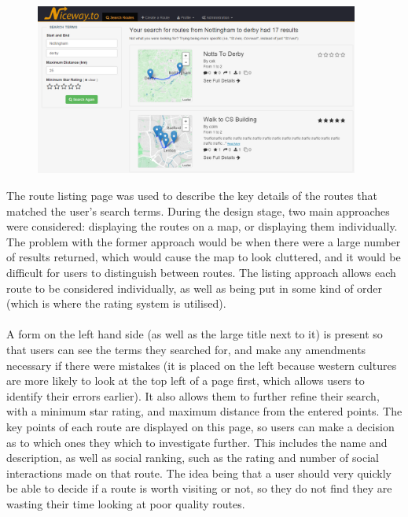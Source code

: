\begin{figure}[!ht]
	\vspace{-5mm}
	\begin{center}
		\includegraphics[width=0.95\textwidth]{images/design/listing.png}
	\end{center}
	\vspace{-10mm}
\end{figure}
\newpage 


\noindent 
The route listing page was used to describe the key details of the routes that matched the user's search terms. During the design stage, two main approaches were considered: displaying the routes on a map, or displaying them individually. The problem with the former approach would be when there were a large number of results returned, which would cause the map to look cluttered, and it would be difficult for users to distinguish between routes. The listing approach allows each route to be considered individually, as well as being put in some kind of order (which is where the rating system is utilised). \ \\
\ \\
A form on the left hand side (as well as the large title next to it) is present so that users can see the terms they searched for, and make any amendments necessary if there were mistakes (it is placed on the left because western cultures are more likely to look at the top left of a page first\cite{mccarthy2004could}, which allows users to identify their errors earlier). It also allows them to further refine their search, with a minimum star rating, and maximum distance from the entered points. The key points of each route are displayed on this page, so users can make a decision as to which ones they which to investigate further. This includes the name and description, as well as social ranking, such as the rating and number of social interactions made on that route. The idea being that a user should very quickly be able to decide if a route is worth visiting or not, so they do not find they are wasting their time looking at poor quality routes.

